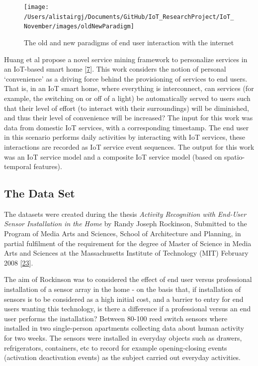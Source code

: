 \documentclass[11pt,]{article}
\begin{document}
\begin{figure}[H]

{\centering \texttt{[image: /Users/alistairgj/Documents/GitHub/IoT\_ResearchProject/IoT\_November/images/oldNewParadigm]} 

}

\caption{The old and new paradigms of end user interaction with the internet}\label{fig:diagram}
\end{figure}

Huang et al propose a novel service mining framework to personalize
services in an IoT-based smart home
{[}\protect\hyperlink{ref-binghuangServiceOrientedComputing16th2018}{7}{]}.
This work considers the notion of personal `convenience' as a driving
force behind the provisioning of services to end users. That is, in an
IoT smart home, where everything is interconnect, can services (for
example, the switching on or off of a light) be automatically served to
users such that their level of effort (to interact with their
surroundings) will be diminished, and thus their level of convenience
will be increased? The input for this work was data from domestic IoT
services, with a corresponding timestamp. The end user in this scenario
performs daily activities by interacting with IoT services, these
interactions are recorded as IoT service event sequences. The output for
this work was an IoT service model and a composite IoT service model
(based on spatio-temporal features).

\hypertarget{the-data-set}{%
\subsection{The Data Set}\label{the-data-set}}

The datasets were created during the thesis \emph{Activity Recognition
with End-User Sensor Installation in the Home} by Randy Joseph
Rockinson, Submitted to the Program of Media Arts and Sciences, School
of Architecture and Planning, in partial fulfilment of the requirement
for the degree of Master of Science in Media Arts and Sciences at the
Massachusetts Institute of Technology (MIT) February 2008
{[}\protect\hyperlink{ref-rockinsonActivityRecognitionHome}{23}{]}.

The aim of Rockinson was to considered the effect of end user versus
professional installation of a sensor array in the home - on the basis
that, if installation of sensors is to be considered as a high initial
cost, and a barrier to entry for end users wanting this technology, is
there a difference if a professional versus an end user performs the
installation? Between 80-100 reed switch sensors where installed in two
single-person apartments collecting data about human activity for two
weeks. The sensors were installed in everyday objects such as drawers,
refrigerators, containers, etc to record for example opening-closing
events (activation deactivation events) as the subject carried out
everyday activities.
\end{document}
